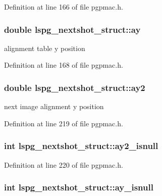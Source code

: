 Definition at line 166 of file pgpmac.h.\hypertarget{structlspg__nextshot__struct_a9e20b9a0aeb41f7f7d653a1c60335bf1}{
\subsubsection[{ay}]{\setlength{\rightskip}{0pt plus 5cm}double {\bf lspg\_\-nextshot\_\-struct::ay}}}
\label{structlspg__nextshot__struct_a9e20b9a0aeb41f7f7d653a1c60335bf1}


alignment table y position 

Definition at line 168 of file pgpmac.h.\hypertarget{structlspg__nextshot__struct_ad13759740204b42e379161f98815f3d0}{
\subsubsection[{ay2}]{\setlength{\rightskip}{0pt plus 5cm}double {\bf lspg\_\-nextshot\_\-struct::ay2}}}
\label{structlspg__nextshot__struct_ad13759740204b42e379161f98815f3d0}


next image alignment y position 

Definition at line 219 of file pgpmac.h.\hypertarget{structlspg__nextshot__struct_ad0f50ec6339296d3d39c8d95131ab6b5}{
\subsubsection[{ay2\_\-isnull}]{\setlength{\rightskip}{0pt plus 5cm}int {\bf lspg\_\-nextshot\_\-struct::ay2\_\-isnull}}}
\label{structlspg__nextshot__struct_ad0f50ec6339296d3d39c8d95131ab6b5}


Definition at line 220 of file pgpmac.h.\hypertarget{structlspg__nextshot__struct_a9da91abc8090532ed98ccd47a3bab775}{
\subsubsection[{ay\_\-isnull}]{\setlength{\rightskip}{0pt plus 5cm}int {\bf lspg\_\-nextshot\_\-struct::ay\_\-isnull}}}
\label{structlspg__nextshot__struct_a9da91abc8090532ed98ccd47a3bab775}


